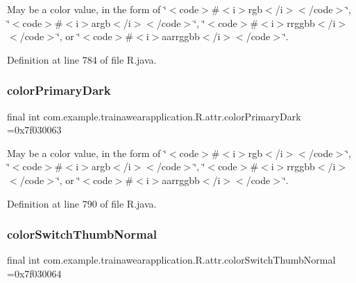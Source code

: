 May be a color value, in the form of \char`\"{}$<$code$>$\#$<$i$>$rgb$<$/i$>$$<$/code$>$\char`\"{}, \char`\"{}$<$code$>$\#$<$i$>$argb$<$/i$>$$<$/code$>$\char`\"{}, \char`\"{}$<$code$>$\#$<$i$>$rrggbb$<$/i$>$$<$/code$>$\char`\"{}, or \char`\"{}$<$code$>$\#$<$i$>$aarrggbb$<$/i$>$$<$/code$>$\char`\"{}. 

Definition at line 784 of file R.\+java.

\mbox{\label{classcom_1_1example_1_1trainawearapplication_1_1_r_1_1attr_a7de60c9bd46c92b929b58e2852d4603e}} 
\subsubsection{\texorpdfstring{colorPrimaryDark}{colorPrimaryDark}}
{\footnotesize\ttfamily final int com.\+example.\+trainawearapplication.\+R.\+attr.\+color\+Primary\+Dark =0x7f030063\hspace{0.3cm}{\ttfamily [static]}}

May be a color value, in the form of \char`\"{}$<$code$>$\#$<$i$>$rgb$<$/i$>$$<$/code$>$\char`\"{}, \char`\"{}$<$code$>$\#$<$i$>$argb$<$/i$>$$<$/code$>$\char`\"{}, \char`\"{}$<$code$>$\#$<$i$>$rrggbb$<$/i$>$$<$/code$>$\char`\"{}, or \char`\"{}$<$code$>$\#$<$i$>$aarrggbb$<$/i$>$$<$/code$>$\char`\"{}. 

Definition at line 790 of file R.\+java.

\mbox{\label{classcom_1_1example_1_1trainawearapplication_1_1_r_1_1attr_a93b9e034a906b5b3ca3a59c9ae884ad3}} 
\subsubsection{\texorpdfstring{colorSwitchThumbNormal}{colorSwitchThumbNormal}}
{\footnotesize\ttfamily final int com.\+example.\+trainawearapplication.\+R.\+attr.\+color\+Switch\+Thumb\+Normal =0x7f030064\hspace{0.3cm}{\ttfamily [static]}}

